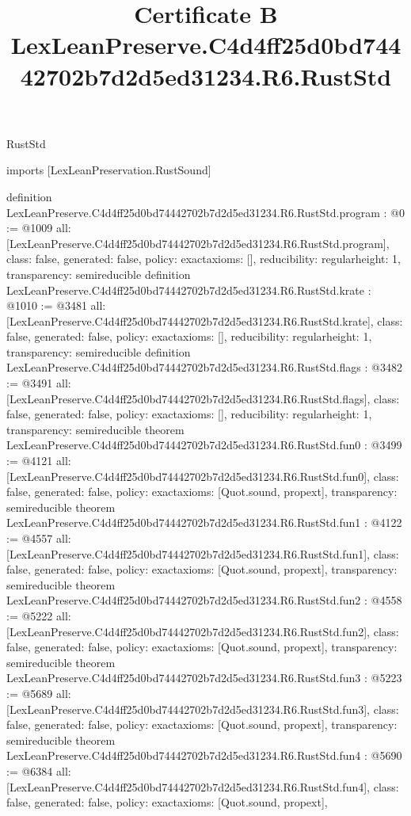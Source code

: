 \begin{lexlean}{RustStd}
\title{Certificate B LexLeanPreserve.C4d4ff25d0bd74442702b7d2d5ed31234.R6.RustStd}
\begin{coremodule}
imports [LexLeanPreservation.RustSound]

definition LexLeanPreserve.C4d4ff25d0bd74442702b7d2d5ed31234.R6.RustStd.program : @0 := @1009 {
  all: [LexLeanPreserve.C4d4ff25d0bd74442702b7d2d5ed31234.R6.RustStd.program],
  class: false,
  generated: false,
  policy: exact{axioms: []},
  reducibility: regular{height: 1},
  transparency: semireducible
}
definition LexLeanPreserve.C4d4ff25d0bd74442702b7d2d5ed31234.R6.RustStd.krate : @1010 := @3481 {
  all: [LexLeanPreserve.C4d4ff25d0bd74442702b7d2d5ed31234.R6.RustStd.krate],
  class: false,
  generated: false,
  policy: exact{axioms: []},
  reducibility: regular{height: 1},
  transparency: semireducible
}
definition LexLeanPreserve.C4d4ff25d0bd74442702b7d2d5ed31234.R6.RustStd.flags : @3482 := @3491 {
  all: [LexLeanPreserve.C4d4ff25d0bd74442702b7d2d5ed31234.R6.RustStd.flags],
  class: false,
  generated: false,
  policy: exact{axioms: []},
  reducibility: regular{height: 1},
  transparency: semireducible
}
theorem LexLeanPreserve.C4d4ff25d0bd74442702b7d2d5ed31234.R6.RustStd.fun0 : @3499 := @4121 {
  all: [LexLeanPreserve.C4d4ff25d0bd74442702b7d2d5ed31234.R6.RustStd.fun0],
  class: false,
  generated: false,
  policy: exact{axioms: [Quot.sound, propext]},
  transparency: semireducible
}
theorem LexLeanPreserve.C4d4ff25d0bd74442702b7d2d5ed31234.R6.RustStd.fun1 : @4122 := @4557 {
  all: [LexLeanPreserve.C4d4ff25d0bd74442702b7d2d5ed31234.R6.RustStd.fun1],
  class: false,
  generated: false,
  policy: exact{axioms: [Quot.sound, propext]},
  transparency: semireducible
}
theorem LexLeanPreserve.C4d4ff25d0bd74442702b7d2d5ed31234.R6.RustStd.fun2 : @4558 := @5222 {
  all: [LexLeanPreserve.C4d4ff25d0bd74442702b7d2d5ed31234.R6.RustStd.fun2],
  class: false,
  generated: false,
  policy: exact{axioms: [Quot.sound, propext]},
  transparency: semireducible
}
theorem LexLeanPreserve.C4d4ff25d0bd74442702b7d2d5ed31234.R6.RustStd.fun3 : @5223 := @5689 {
  all: [LexLeanPreserve.C4d4ff25d0bd74442702b7d2d5ed31234.R6.RustStd.fun3],
  class: false,
  generated: false,
  policy: exact{axioms: [Quot.sound, propext]},
  transparency: semireducible
}
theorem LexLeanPreserve.C4d4ff25d0bd74442702b7d2d5ed31234.R6.RustStd.fun4 : @5690 := @6384 {
  all: [LexLeanPreserve.C4d4ff25d0bd74442702b7d2d5ed31234.R6.RustStd.fun4],
  class: false,
  generated: false,
  policy: exact{axioms: [Quot.sound, propext]},
}
\end{coremodule}
\end{lexlean}
